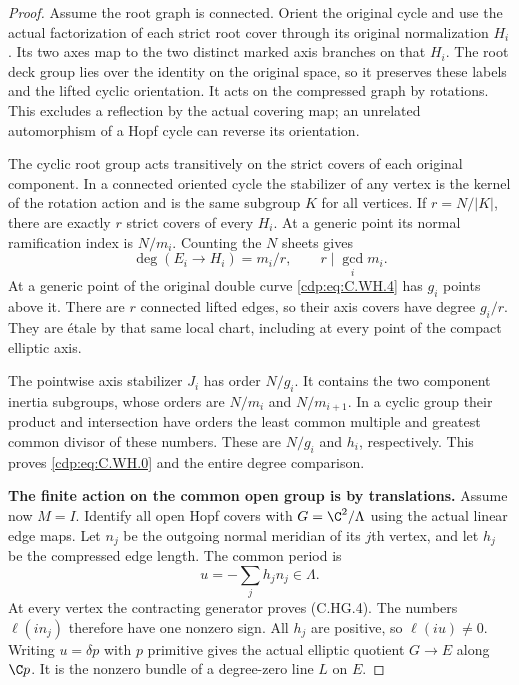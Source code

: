 \begin{proof}
Assume the root graph is connected.
Orient the original cycle and use
the actual factorization of each
strict root cover through its
original normalization $H_i$.
Its two axes map to the two distinct
marked axis branches on that $H_i$.
The root deck group lies over the
identity on the original space,
so it preserves these labels and
the lifted cyclic orientation.
It acts on the compressed graph
by rotations. This excludes a
reflection by the actual covering
map; an unrelated automorphism of
a Hopf cycle can reverse its
orientation.

The cyclic root group acts transitively
on the strict covers of each original
component. In a connected oriented
cycle the stabilizer of any vertex
is the kernel of the rotation action
and is the same subgroup $K$ for all
vertices. If $r=N/|K|$, there are
exactly $r$ strict covers of every
$H_i$. At a generic point its normal
ramification index is $N/m_i$.
Counting the $N$ sheets gives
\[
               \deg(E_i\to H_i)=m_i/r,
                    \qquad r\mid\gcd_i m_i.
\tag{C.WH.6}\label{cdp:eq:C.WH.6}
\]
At a generic point of the original
double curve \eqref{cdp:eq:C.WH.4} has $g_i$
points above it. There are $r$
connected lifted edges, so their
axis covers have degree $g_i/r$.
They are \'{e}tale by that same
local chart, including at every
point of the compact elliptic axis.

The pointwise axis stabilizer $J_i$
has order $N/g_i$. It contains the
two component inertia subgroups,
whose orders are $N/m_i$ and
$N/m_{i+1}$. In a cyclic group their
product and intersection have orders
the least common multiple and
greatest common divisor of these
numbers. These are $N/g_i$ and $h_i$,
respectively. This proves \eqref{cdp:eq:C.WH.0}
and the entire degree comparison.

\par\medskip\noindent\textbf{The finite action on the common open group is by translations.}
Assume now $M=I$. Identify all open
Hopf covers with $G=\C^2/\Lambda$
using the actual linear edge maps.
Let $n_j$ be the outgoing normal
meridian of its $j$th vertex, and
let $h_j$ be the compressed edge
length. The common period is
\[
                u=-\sum_j h_j n_j\in\Lambda.
\tag{C.WH.7}\label{cdp:eq:C.WH.7}
\]
At every vertex the contracting
generator proves (C.HG.4). The
numbers $\ell(i n_j)$ therefore
have one nonzero sign. All $h_j$
are positive, so $\ell(iu)\ne0$.
Writing $u=\delta p$ with $p$
primitive gives the actual elliptic
quotient $G\to E$ along $\C p$.
It is the nonzero bundle of a
degree-zero line $L$ on $E$.


\end{proof}
